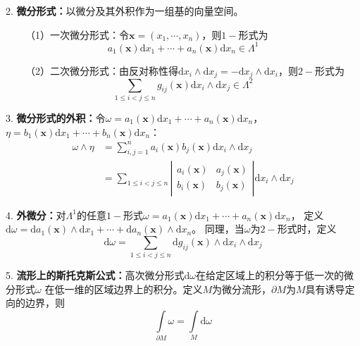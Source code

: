 2. \textbf{微分形式：}以微分及其外积作为一组基的向量空间。

~~~~（1）一次微分形式：令$\boldsymbol{x}=(x_1,\cdots,x_n)$，则$1-$形式为
\begin{equation*}
    a_1(\boldsymbol{x})\mathrm{d}x_1 +\cdots +a_n(\boldsymbol{x})\mathrm{d}x_n \in \Lambda^1
\end{equation*}

~~~~（2）二次微分形式：由反对称性得$\mathrm{d}x_i \wedge \mathrm{d}x_j =-\mathrm{d}x_j \wedge \mathrm{d}x_i$，则$2-$形式为
\begin{equation*}
    \sum\limits_{1\leqslant i<j \leqslant n} g_{ij}(\boldsymbol{x}) \mathrm{d}x_i \wedge \mathrm{d}x_j \in \Lambda^2
\end{equation*}

3. \textbf{微分形式的外积：}令$\omega = a_1(\boldsymbol{x})\mathrm{d}x_1+\cdots + a_n(\boldsymbol{x})\mathrm{d}x_n$，$\eta = b_1(\boldsymbol{x})\mathrm{d}x_1+\cdots + b_n(\boldsymbol{x})\mathrm{d}x_n$：
\begin{align*}
    \omega \wedge \eta &=\sum\limits_{i,j=1}^n a_i(\boldsymbol{x})b_j(\boldsymbol{x})\mathrm{d}x_i \wedge \mathrm{d}x_j\\
    &=\sum\limits_{1\leqslant i<j \leqslant n}\left|\begin{matrix}
        a_i(\boldsymbol{x}) & a_j(\boldsymbol{x})\\
        b_i(\boldsymbol{x}) & b_j(\boldsymbol{x})
    \end{matrix}\right| \mathrm{d}x_i \wedge \mathrm{d}x_j
\end{align*}

4. \textbf{外微分：}对$\Lambda^1$的任意$1-$形式$\omega = a_1(\boldsymbol{x})\mathrm{d}x_1+\cdots+a_n(\boldsymbol{x})\mathrm{d}x_n$，
定义$\mathrm{d} \omega = \mathrm{d}a_1(\boldsymbol{x})\wedge \mathrm{d}x_1+\cdots+\mathrm{d}a_n(\boldsymbol{x})\wedge \mathrm{d}x_n$。
同理，当$\omega$为$2-$形式时，定义
\begin{equation*}
    \mathrm{d}\omega = \sum\limits_{1\leqslant i<j \leqslant n} \mathrm{d}g_{ij}(\boldsymbol{x})\wedge  \mathrm{d}x_i \wedge \mathrm{d}x_j
\end{equation*}

5. \textbf{流形上的斯托克斯公式：}高次微分形式$\mathrm{d}\omega$在给定区域上的积分等于低一次的微分形式$\omega$ 在低一维的区域边界上的积分。定义$M$为微分流形，$\partial M$为$M$具有诱导定向的边界，则
\begin{equation*}
    \int \limits_{\partial M}\omega = \int\limits_{M}\mathrm{d}\omega
\end{equation*}

